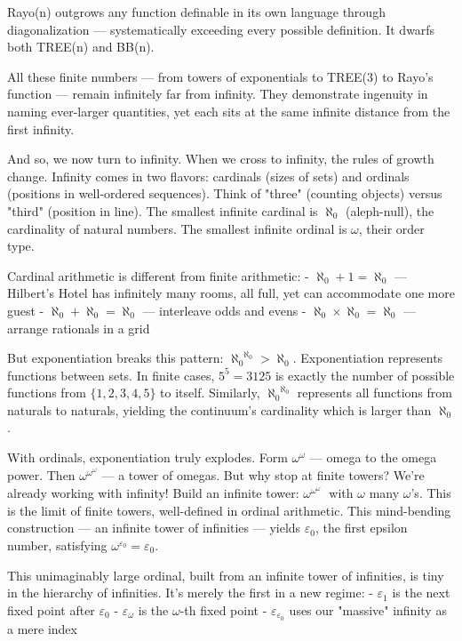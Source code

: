 Rayo(n) outgrows any function definable in its own language through diagonalization — systematically exceeding every possible definition. It dwarfs both TREE(n) and BB(n).

All these finite numbers — from towers of exponentials to TREE(3) to Rayo's function — remain infinitely far from infinity. They demonstrate ingenuity in naming ever-larger quantities, yet each sits at the same infinite distance from the first infinity.

And so, we now turn to infinity. When we cross to infinity, the rules of growth change. Infinity comes in two flavors: cardinals (sizes of sets) and ordinals (positions in well-ordered sequences). Think of "three" (counting objects) versus "third" (position in line). The smallest infinite cardinal is $\aleph_0$ (aleph-null), the cardinality of natural numbers. The smallest infinite ordinal is $\omega$, their order type.

Cardinal arithmetic is different from finite arithmetic:
- $\aleph_0 + 1 = \aleph_0$ — Hilbert's Hotel has infinitely many rooms, all full, yet can accommodate one more guest
- $\aleph_0 + \aleph_0 = \aleph_0$ — interleave odds and evens
- $\aleph_0 \times \aleph_0 = \aleph_0$ — arrange rationals in a grid

But exponentiation breaks this pattern: ${\aleph_0}^{\aleph_0} > \aleph_0$. Exponentiation represents functions between sets. In finite cases, $5^5 = 3125$ is exactly the number of possible functions from $\{1,2,3,4,5\}$ to itself. Similarly, ${\aleph_0}^{\aleph_0}$ represents all functions from naturals to naturals, yielding the continuum's cardinality which is larger than $\aleph_0$. 

With ordinals, exponentiation truly explodes. Form $\omega^\omega$ — omega to the omega power. Then $\omega^{\omega^\omega}$ — a tower of omegas. But why stop at finite towers? We're already working with infinity! Build an infinite tower: $\omega^{\omega^{\omega^{\cdot^{\cdot^{\cdot}}}}}$ with $\omega$ many $\omega$'s. This is the limit of finite towers, well-defined in ordinal arithmetic. This mind-bending construction — an infinite tower of infinities — yields $\varepsilon_0$, the first epsilon number, satisfying $\omega^{\varepsilon_0} = \varepsilon_0$.

This unimaginably large ordinal, built from an infinite tower of infinities, is tiny in the hierarchy of infinities. It's merely the first in a new regime:
- $\varepsilon_1$ is the next fixed point after $\varepsilon_0$
- $\varepsilon_\omega$ is the $\omega$-th fixed point
- $\varepsilon_{\varepsilon_0}$ uses our "massive" infinity as a mere index

